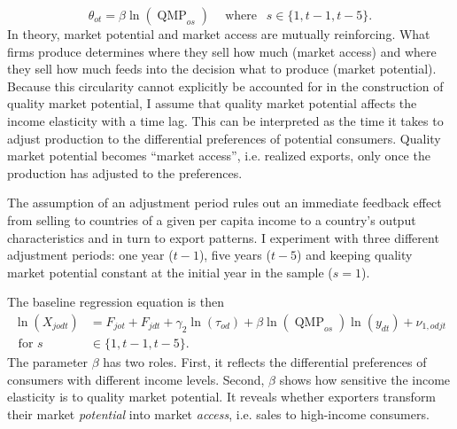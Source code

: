 \documentclass[12pt,a4paper,oneside,times]{article}   	%
\DeclareMathOperator{\MP}{QMP}
\begin{document}
\[\theta_{ot} =  \beta\ln(\MP_{os}) \ \ \ \  \text{ where } \ \  s \in \{1,t-1,t-5\} .\]
In theory, market potential and market access are mutually reinforcing. What firms produce determines where they sell how much (market access) and where they sell how much feeds into the decision what to produce (market potential). Because this circularity cannot explicitly be accounted for in the construction of quality market potential, I assume that quality market potential affects the income elasticity with a time lag. This can be interpreted as the time it takes to adjust production to the differential preferences of potential consumers. Quality market potential becomes ``market access'', i.e. realized exports, only once the production has adjusted to the preferences.  

The assumption of an adjustment period rules out an immediate feedback effect from selling to countries of a given per capita income to a country's output characteristics and in turn to export patterns. I experiment with three different adjustment periods: one year ($t-1$), five years ($t-5$) and keeping quality market potential constant at the initial year in the sample ($s=1$). 

The baseline regression equation is then
\begin{align}\label{eq:estimating equation main}
\ln(X_{jodt})
&= F_{jot}+ F_{jdt} + \gamma_{2}\ln(\tau_{od})+ \beta\ln(\MP_{os})\ln(y_{dt}) + \nu_{1,odjt} \\
\text{ for } s &\in \{1,t-1,t-5\} \nonumber. 
\end{align}
The parameter $\beta$ has two roles. First, it reflects the differential preferences of consumers with different income levels. Second, $\beta$ shows how sensitive the income elasticity is to  quality market potential. It reveals whether exporters transform their market \emph{potential} into market \emph{access}, i.e. sales to high-income consumers.  
\end{document}
